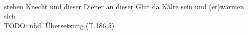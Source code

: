 \begin{exe}
\ex \label{ex:T37624} \gll {}                \object{:} \\
{stehen} {Knecht} {und} {dieser} {Diener} {an} {dieser} {Glut} {} {da} {Kälte} {sein} {} {und} {(er)wärmen} {sich} {}\\
\glt TODO: nhd. Übersetzung (T.186,5)
\end{exe}
